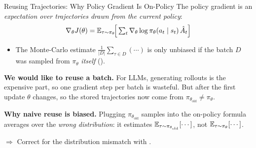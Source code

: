 \begin{frame}{Reusing Trajectories: Why Policy Gradient Is On-Policy}
  The policy gradient is an \emph{expectation over trajectories drawn from the current policy}:
  \[
    \nabla_\theta J(\theta) = \mathbb{E}_{\tau \sim \pi_\theta}\!\Big[\textstyle\sum_t \nabla_\theta \log \pi_\theta(a_t \mid s_t)\, \hat{A}_t\Big]
  \]
  \begin{itemize}[nosep]
    \item The Monte-Carlo estimate $\frac{1}{|D|}\sum_{\tau \in D}(\cdots)$ is only unbiased if the batch $D$ was sampled from $\pi_\theta$ \emph{itself} ().
  \end{itemize}

  \vspace{0.3em}
  \textbf{We would like to reuse a batch.} For LLMs, generating rollouts is the expensive part, so one gradient step per batch is wasteful. But after the first update $\theta$ changes, so the stored trajectories now come from $\pi_{\theta_\text{old}} \neq \pi_\theta$.

  \vspace{0.3em}
  \textbf{Why naive reuse is biased.} Plugging $\pi_{\theta_\text{old}}$ samples into the on-policy formula averages over the \emph{wrong distribution}: it estimates $\mathbb{E}_{\tau \sim \pi_{\theta_\text{old}}}[\cdots]$, not $\mathbb{E}_{\tau \sim \pi_\theta}[\cdots]$.

  \vspace{0.2em}
  $\Rightarrow$ Correct for the distribution mismatch with .
\end{frame}

